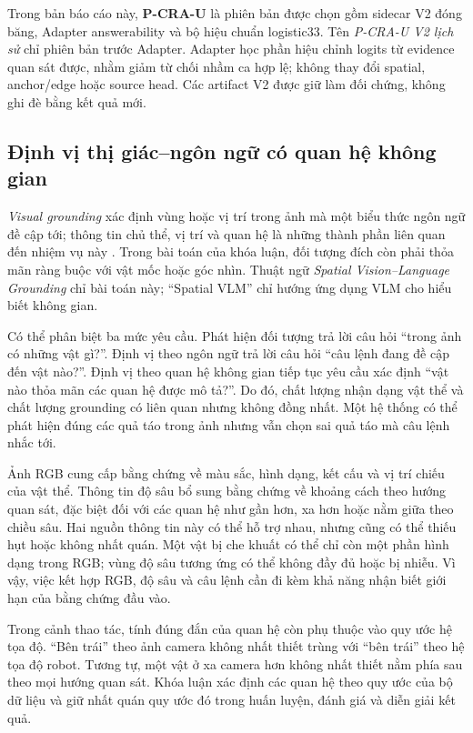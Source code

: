Trong bản báo cáo này, \textbf{P-CRA-U} là phiên bản được chọn gồm
sidecar V2 đóng băng, Adapter answerability và bộ hiệu chuẩn logistic33.
Tên \emph{P-CRA-U V2 lịch sử} chỉ phiên bản trước Adapter. Adapter học
phần hiệu chỉnh logits từ evidence quan sát được, nhằm giảm từ chối nhầm
ca hợp lệ; không thay đổi spatial, anchor/edge hoặc source head.
Các artifact V2 được giữ làm đối chứng, không ghi đè bằng kết quả mới.

\subsection{Định vị thị giác--ngôn ngữ có quan hệ không gian}

\textit{Visual grounding} xác định vùng hoặc vị trí trong ảnh mà một biểu thức ngôn ngữ đề cập tới; thông tin chủ thể, vị trí và quan hệ là những thành phần liên quan đến nhiệm vụ này \cite{yu2018mattnet}. Trong bài toán của khóa luận, đối tượng đích còn phải thỏa mãn ràng buộc với vật mốc hoặc góc nhìn. Thuật ngữ \textit{Spatial Vision--Language Grounding} chỉ bài toán này; ``Spatial VLM'' chỉ hướng ứng dụng VLM cho hiểu biết không gian.

Có thể phân biệt ba mức yêu cầu. Phát hiện đối tượng trả lời câu hỏi ``trong ảnh có những vật gì?''. Định vị theo ngôn ngữ trả lời câu hỏi ``câu lệnh đang đề cập đến vật nào?''. Định vị theo quan hệ không gian tiếp tục yêu cầu xác định ``vật nào thỏa mãn các quan hệ được mô tả?''. Do đó, chất lượng nhận dạng vật thể và chất lượng grounding có liên quan nhưng không đồng nhất. Một hệ thống có thể phát hiện đúng các quả táo trong ảnh nhưng vẫn chọn sai quả táo mà câu lệnh nhắc tới.

Ảnh RGB cung cấp bằng chứng về màu sắc, hình dạng, kết cấu và vị trí chiếu của vật thể. Thông tin độ sâu bổ sung bằng chứng về khoảng cách theo hướng quan sát, đặc biệt đối với các quan hệ như gần hơn, xa hơn hoặc nằm giữa theo chiều sâu. Hai nguồn thông tin này có thể hỗ trợ nhau, nhưng cũng có thể thiếu hụt hoặc không nhất quán. Một vật bị che khuất có thể chỉ còn một phần hình dạng trong RGB; vùng độ sâu tương ứng có thể không đầy đủ hoặc bị nhiễu. Vì vậy, việc kết hợp RGB, độ sâu và câu lệnh cần đi kèm khả năng nhận biết giới hạn của bằng chứng đầu vào.

Trong cảnh thao tác, tính đúng đắn của quan hệ còn phụ thuộc vào quy ước hệ tọa độ. ``Bên trái'' theo ảnh camera không nhất thiết trùng với ``bên trái'' theo hệ tọa độ robot. Tương tự, một vật ở xa camera hơn không nhất thiết nằm phía sau theo mọi hướng quan sát. Khóa luận xác định các quan hệ theo quy ước của bộ dữ liệu và giữ nhất quán quy ước đó trong huấn luyện, đánh giá và diễn giải kết quả.

